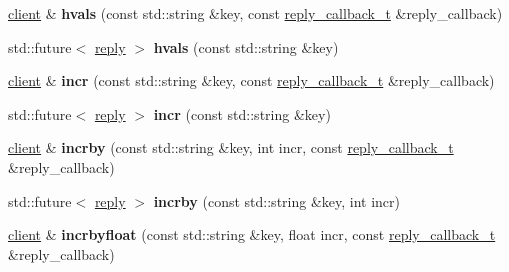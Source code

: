 \begin{DoxyCompactItemize}
\hyperlink{classcpp__redis_1_1client}{client} \& {\bfseries hvals} (const std\+::string \&key, const \hyperlink{classcpp__redis_1_1client_a061a1140d36d2eaeda82b09a0bb3f9f2}{reply\+\_\+callback\+\_\+t} \&reply\+\_\+callback)
\item 
\mbox{\label{classcpp__redis_1_1client_af391940cf5b996a0682e881da446b7da}} 
std\+::future$<$ \hyperlink{classcpp__redis_1_1reply}{reply} $>$ {\bfseries hvals} (const std\+::string \&key)
\item 
\mbox{\label{classcpp__redis_1_1client_a2f9ba6c7e83451207403096b19da4faa}} 
\hyperlink{classcpp__redis_1_1client}{client} \& {\bfseries incr} (const std\+::string \&key, const \hyperlink{classcpp__redis_1_1client_a061a1140d36d2eaeda82b09a0bb3f9f2}{reply\+\_\+callback\+\_\+t} \&reply\+\_\+callback)
\item 
\mbox{\label{classcpp__redis_1_1client_a36ce71119f98cdc29fb29ca33c8b1ff1}} 
std\+::future$<$ \hyperlink{classcpp__redis_1_1reply}{reply} $>$ {\bfseries incr} (const std\+::string \&key)
\item 
\mbox{\label{classcpp__redis_1_1client_a7ee625ebbbfc9fb6f9821b94055e0a5c}} 
\hyperlink{classcpp__redis_1_1client}{client} \& {\bfseries incrby} (const std\+::string \&key, int incr, const \hyperlink{classcpp__redis_1_1client_a061a1140d36d2eaeda82b09a0bb3f9f2}{reply\+\_\+callback\+\_\+t} \&reply\+\_\+callback)
\item 
\mbox{\label{classcpp__redis_1_1client_ab7dbabc00708da38938bb461b195f177}} 
std\+::future$<$ \hyperlink{classcpp__redis_1_1reply}{reply} $>$ {\bfseries incrby} (const std\+::string \&key, int incr)
\item 
\mbox{\label{classcpp__redis_1_1client_a3ae6ca0b7896748a8fe5a450550c422e}} 
\hyperlink{classcpp__redis_1_1client}{client} \& {\bfseries incrbyfloat} (const std\+::string \&key, float incr, const \hyperlink{classcpp__redis_1_1client_a061a1140d36d2eaeda82b09a0bb3f9f2}{reply\+\_\+callback\+\_\+t} \&reply\+\_\+callback)
\item 
\mbox{\label{classcpp__redis_1_1client_a32c78234437f7f02492e3e01dd44bc43}} 

\end{DoxyCompactItemize}
